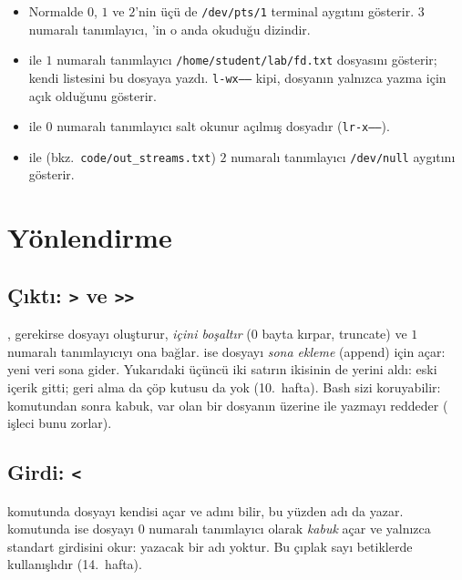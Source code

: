 \begin{itemize}
  \item Normalde $0$, $1$ ve $2$'nin üçü de \texttt{/dev/pts/1} terminal aygıtını gösterir. $3$ numaralı tanımlayıcı, 'in o anda okuduğu dizindir.
  \item {} ile $1$ numaralı tanımlayıcı \texttt{/home/student/lab/fd.txt} dosyasını gösterir;  kendi listesini bu dosyaya yazdı. \texttt{l-wx------} kipi, dosyanın yalnızca yazma için açık olduğunu gösterir.
  \item {} ile $0$ numaralı tanımlayıcı salt okunur açılmış dosyadır (\texttt{lr-x------}).
  \item {} ile (bkz.\ \texttt{code/out\_streams.txt}) $2$ numaralı tanımlayıcı \texttt{/dev/null} aygıtını gösterir.
\end{itemize}

\section{Yönlendirme}
\label{sec:redir}

\subsection{Çıktı: \texttt{>} ve \texttt{>>}}



, gerekirse dosyayı oluşturur, \emph{içini boşaltır} ($0$ bayta kırpar, truncate) ve $1$ numaralı tanımlayıcıyı ona bağlar.  ise dosyayı \emph{sona ekleme} (append) için açar: yeni veri sona gider. Yukarıdaki üçüncü  iki satırın ikisinin de yerini aldı: eski içerik gitti; geri alma da çöp kutusu da yok (10.~hafta). Bash sizi koruyabilir:  komutundan sonra kabuk, var olan bir dosyanın üzerine \cmd{>} ile yazmayı reddeder (\cmd{>|} işleci bunu zorlar).

\subsection{Girdi: \texttt{<}}



 komutunda dosyayı  kendisi açar ve adını bilir, bu yüzden adı da yazar.  komutunda ise dosyayı $0$ numaralı tanımlayıcı olarak \emph{kabuk} açar ve  yalnızca standart girdisini okur: yazacak bir adı yoktur. Bu çıplak sayı betiklerde kullanışlıdır (14.~hafta).

